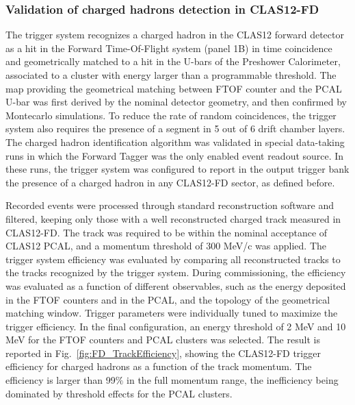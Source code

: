 \subsubsection{Validation of charged hadrons detection in CLAS12-FD}

The trigger system recognizes a charged hadron in the CLAS12 forward detector as a hit in the Forward Time-Of-Flight system (panel 1B) in time coincidence and geometrically matched to a hit in the U-bars of the Preshower Calorimeter, associated to a cluster with energy larger than a programmable threshold. The map providing the geometrical matching between FTOF counter and the PCAL U-bar was first derived by the nominal detector geometry, and then confirmed by Montecarlo simulations. To reduce the rate of random coincidences, the trigger system also requires the presence of a segment in 5 out of 6 drift chamber layers. The charged hadron identification algorithm was validated in special data-taking runs in which the Forward Tagger was the only enabled event readout source. In these runs, the trigger system was configured to report in the output trigger bank the presence of a charged hadron in any CLAS12-FD sector, as defined before. 

Recorded events were processed through standard reconstruction software and filtered, keeping only those with a well reconstructed charged track measured in CLAS12-FD. The track was required to be within the nominal acceptance of CLAS12 PCAL, and a momentum threshold of 300 MeV/c was applied. The trigger system efficiency was evaluated by comparing all reconstructed tracks to the tracks recognized by the trigger system. During commissioning, the efficiency was evaluated as a function of different observables, such as the energy deposited in the FTOF counters and in the PCAL, and the topology of the geometrical matching window. Trigger parameters were individually tuned to maximize the trigger efficiency. In the final configuration, an energy threshold of 2 MeV and 10 MeV for the FTOF counters and PCAL clusters was selected.  The result is reported in Fig.~\ref{fig:FD_TrackEfficiency}, showing the CLAS12-FD trigger efficiency for charged hadrons as a function of the track momentum. The efficiency is larger than 99$\%$ in the full momentum range, the inefficiency being dominated by threshold effects for the PCAL clusters.

